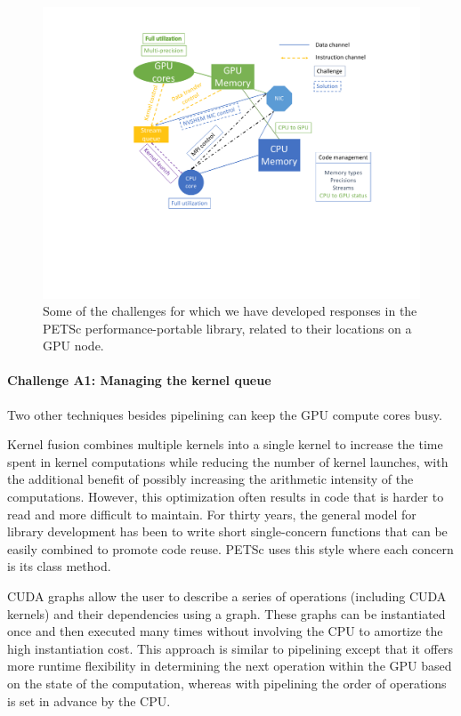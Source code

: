 \documentclass[5p,times]{elsarticle}
\begin{document}
\begin{figure}[htbp]
\begin{center}
\includegraphics[trim = 1.5in 2.5in .3in .6in, clip,width=.99\linewidth]{new-challenges.pdf}
\caption{Some of the challenges for which we have developed responses in the PETSc performance-portable library, related to their locations on a GPU node.}
\label{fig:challenges}
\end{center}
\end{figure}



\paragraph{Challenge A1: Managing the kernel queue}

Two other techniques besides pipelining can keep the GPU compute cores busy. 

Kernel fusion combines multiple kernels into a single kernel to increase the time spent in kernel computations while reducing the number of kernel launches, with the additional benefit of possibly increasing the arithmetic intensity of the computations.
However, this optimization often results in code that is harder to read and more difficult to maintain.
For thirty years, the general model for library development has been to write short single-concern functions that can be easily combined to promote code reuse. PETSc uses this style where
each concern is its class method.
    
CUDA graphs allow the user to describe a series of operations (including CUDA kernels) and their dependencies using a graph.
These graphs can be instantiated once and then executed many times without involving the CPU to amortize the high instantiation cost.
This approach is similar to pipelining except that it offers more runtime flexibility in determining the next operation within the GPU based on the state of the computation, whereas with pipelining the
order of operations is set in advance by the CPU.
\end{document}
